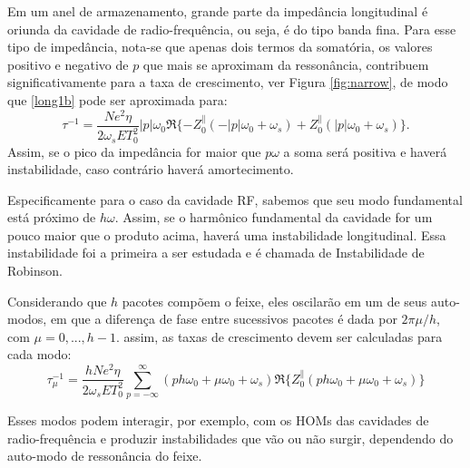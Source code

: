Em um anel de armazenamento, grande parte da impedância longitudinal é oriunda da cavidade de radio-frequência, ou seja, é do tipo banda fina. Para esse tipo de impedância, nota-se que apenas dois termos da somatória, os valores positivo e negativo de $p$ que mais se aproximam da ressonância, contribuem significativamente para a taxa de crescimento, ver Figura \ref{fig:narrow}, de modo que \eqref{long1b} pode ser aproximada para: 
\begin{equation} \label{narrowband}
 \tau^{-1}=\frac{Ne^2 \eta}{2\omega_s E T_0^2}|p|\omega_0
\Re\{-Z^\lVert_0(-|p|\omega_0 +\omega_s) + Z^\lVert_0(|p|\omega_0 +\omega_s)\}.
\end{equation}
Assim, se o pico da impedância for maior que $p\omega$ a soma será positiva e haverá instabilidade, caso contrário haverá amortecimento.


Especificamente para o caso da cavidade RF, sabemos que seu modo fundamental está próximo de $h\omega$. Assim, se o harmônico fundamental da cavidade for um pouco maior que o produto acima, haverá uma instabilidade longitudinal. Essa instabilidade foi a primeira a ser estudada e é chamada de Instabilidade de Robinson.

Considerando que $h$ pacotes compõem o feixe, eles oscilarão em um de seus auto-modos, em que a diferença de fase entre sucessivos pacotes é dada por $2\pi\mu/h$, com $\mu=0,...,h-1$. assim, as taxas de crescimento devem ser calculadas para cada modo:
\begin{equation}
\tau^{-1}_\mu=\frac{h N e^2 \eta}{2\omega_s E T_0^2}
\sum^\infty_{p=-\infty} (ph\omega_0+\mu\omega_0+\omega_s)
\Re\{Z^\lVert_0(ph\omega_0+\mu\omega_0+\omega_s)\}
\end{equation}

Esses modos podem interagir, por exemplo, com os HOMs das cavidades de radio-frequência e produzir instabilidades que vão ou não surgir, dependendo do auto-modo de ressonância do feixe.

